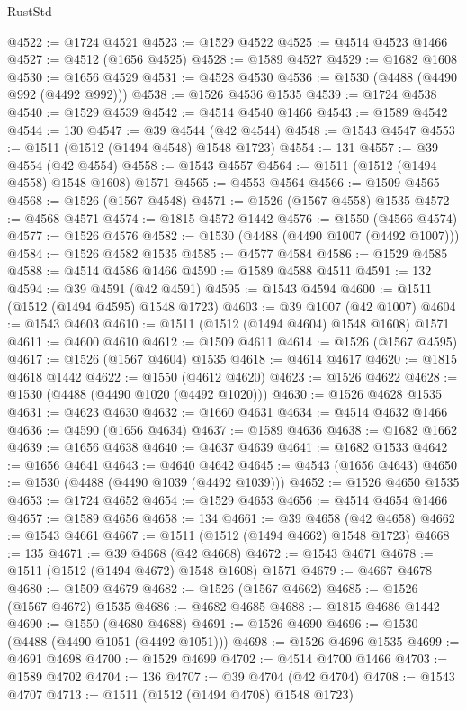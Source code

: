 \begin{lexlean}{RustStd}
\begin{coremodule}
{{@4522 := @1724 @4521
@4523 := @1529 @4522
@4525 := @4514 @4523 @1466
@4527 := @4512 (@1656 @4525)
@4528 := @1589 @4527
@4529 := @1682 @1608
@4530 := @1656 @4529
@4531 := @4528 @4530
@4536 := @1530 (@4488 (@4490 @992 (@4492 @992)))
@4538 := @1526 @4536 @1535
@4539 := @1724 @4538
@4540 := @1529 @4539
@4542 := @4514 @4540 @1466
@4543 := @1589 @4542
@4544 := 130
@4547 := @39 @4544 (@42 @4544)
@4548 := @1543 @4547
@4553 := @1511 (@1512 (@1494 @4548) @1548 @1723)
@4554 := 131
@4557 := @39 @4554 (@42 @4554)
@4558 := @1543 @4557
@4564 := @1511 (@1512 (@1494 @4558) @1548 @1608) @1571
@4565 := @4553 @4564
@4566 := @1509 @4565
@4568 := @1526 (@1567 @4548)
@4571 := @1526 (@1567 @4558) @1535
@4572 := @4568 @4571
@4574 := @1815 @4572 @1442
@4576 := @1550 (@4566 @4574)
@4577 := @1526 @4576
@4582 := @1530 (@4488 (@4490 @1007 (@4492 @1007)))
@4584 := @1526 @4582 @1535
@4585 := @4577 @4584
@4586 := @1529 @4585
@4588 := @4514 @4586 @1466
@4590 := @1589 @4588 @4511
@4591 := 132
@4594 := @39 @4591 (@42 @4591)
@4595 := @1543 @4594
@4600 := @1511 (@1512 (@1494 @4595) @1548 @1723)
@4603 := @39 @1007 (@42 @1007)
@4604 := @1543 @4603
@4610 := @1511 (@1512 (@1494 @4604) @1548 @1608) @1571
@4611 := @4600 @4610
@4612 := @1509 @4611
@4614 := @1526 (@1567 @4595)
@4617 := @1526 (@1567 @4604) @1535
@4618 := @4614 @4617
@4620 := @1815 @4618 @1442
@4622 := @1550 (@4612 @4620)
@4623 := @1526 @4622
@4628 := @1530 (@4488 (@4490 @1020 (@4492 @1020)))
@4630 := @1526 @4628 @1535
@4631 := @4623 @4630
@4632 := @1660 @4631
@4634 := @4514 @4632 @1466
@4636 := @4590 (@1656 @4634)
@4637 := @1589 @4636
@4638 := @1682 @1662
@4639 := @1656 @4638
@4640 := @4637 @4639
@4641 := @1682 @1533
@4642 := @1656 @4641
@4643 := @4640 @4642
@4645 := @4543 (@1656 @4643)
@4650 := @1530 (@4488 (@4490 @1039 (@4492 @1039)))
@4652 := @1526 @4650 @1535
@4653 := @1724 @4652
@4654 := @1529 @4653
@4656 := @4514 @4654 @1466
@4657 := @1589 @4656
@4658 := 134
@4661 := @39 @4658 (@42 @4658)
@4662 := @1543 @4661
@4667 := @1511 (@1512 (@1494 @4662) @1548 @1723)
@4668 := 135
@4671 := @39 @4668 (@42 @4668)
@4672 := @1543 @4671
@4678 := @1511 (@1512 (@1494 @4672) @1548 @1608) @1571
@4679 := @4667 @4678
@4680 := @1509 @4679
@4682 := @1526 (@1567 @4662)
@4685 := @1526 (@1567 @4672) @1535
@4686 := @4682 @4685
@4688 := @1815 @4686 @1442
@4690 := @1550 (@4680 @4688)
@4691 := @1526 @4690
@4696 := @1530 (@4488 (@4490 @1051 (@4492 @1051)))
@4698 := @1526 @4696 @1535
@4699 := @4691 @4698
@4700 := @1529 @4699
@4702 := @4514 @4700 @1466
@4703 := @1589 @4702
@4704 := 136
@4707 := @39 @4704 (@42 @4704)
@4708 := @1543 @4707
@4713 := @1511 (@1512 (@1494 @4708) @1548 @1723)
}}
\end{coremodule}
\end{lexlean}
